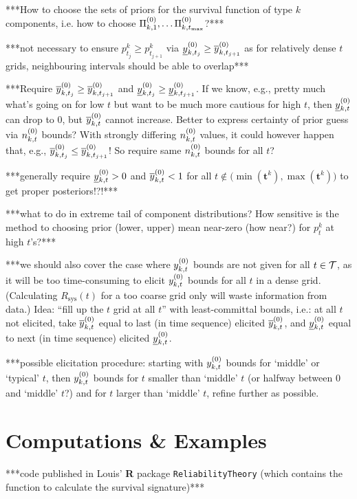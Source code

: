 \documentclass[authoryear, 12pt, a4paper]{elsarticle}
\newcommand{\bs}[1]{\boldsymbol{#1}}
\renewcommand{\vec}[1]{{\bs#1}}
\newcommand{\Rsys}{R_\text{sys}}
\def\tmax{t_\text{max}}
\begin{document}
***How to choose the sets of priors for the survival function of type $k$ components,
i.e. how to choose $\PkZi{1}, \ldots \PkZi{\tmax}$?***

***not necessary to ensure $p^k_{t_j} \ge p^k_{t_{j+1}}$ via $\underline{y}^{(0)}_{k,t_j} \ge \overline{y}^{(0)}_{k,t_{j+1}}$
as for relatively dense $t$ grids, neighbouring intervals should be able to overlap***

***Require $\overline{y}^{(0)}_{k,t_j} \ge \overline{y}^{(0)}_{k,t_{j+1}}$ and $\underline{y}^{(0)}_{k,t_j} \ge \underline{y}^{(0)}_{k,t_{j+1}}$.
If we know, e.g., pretty much what's going on for low $t$
but want to be much more cautious for high $t$,
then $\underline{y}^{(0)}_{k,t}$ can drop to 0, but $\overline{y}^{(0)}_{k,t}$ cannot increase.
Better to express certainty of prior guess via $n^{(0)}_{k,t}$ bounds?
With strongly differing $n^{(0)}_{k,t}$ values, it could however happen that, e.g., $\overline{y}^{(0)}_{k,t_j} \le \overline{y}^{(0)}_{k,t_{j+1}}$!
So require same $n^{(0)}_{k,t}$ bounds for all $t$?

***generally require $\underline{y}^{(0)}_{k,t} > 0$ and $\overline{y}^{(0)}_{k,t} < 1$ for all $t \not\in \big(\min(\vec{t}^k), \max(\vec{t}^k)\big)$
to get proper posteriors!?!***

***what to do in extreme tail of component distributions?
How sensitive is the method to choosing prior (lower, upper) mean near-zero (how near?) for $p^k_t$ at high $t$'s?***

***we should also cover the case where $y^{(0)}_{k,t}$ bounds are not given for all $t \in {\cal T}$,
as it will be too time-consuming to elicit $y^{(0)}_{k,t}$ bounds for all $t$ in a dense grid.
(Calculating $\Rsys(t)$ for a too coarse grid only will waste information from data.)
Idea: ``fill up the $t$ grid at all $t$'' with least-committal bounds, i.e.: 
at all $t$ not elicited, take $\overline{y}^{(0)}_{k,t}$ equal to last (in time sequence) elicited $\overline{y}^{(0)}_{k,t}$,
and $\underline{y}^{(0)}_{k,t}$ equal to next (in time sequence) elicited $\underline{y}^{(0)}_{k,t}$.

***possible elicitation procedure: starting with $y^{(0)}_{k,t}$ bounds for `middle' or `typical' $t$,
then $y^{(0)}_{k,t}$ bounds for $t$ smaller than `middle' $t$ (or halfway between 0 and `middle' $t$?) and for $t$ larger than `middle' $t$,
refine further as possible.

\section{Computations \& Examples}

***code published in Louis' \textbf{R} package \texttt{ReliabilityTheory}
(which contains the function to calculate the survival signature)***
\end{document}
